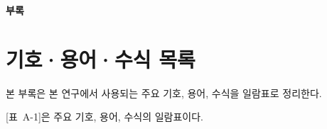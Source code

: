 
\clearpage
\thispagestyle{plain}
{}
\vspace*{0.35\textheight}
\begin{center}{\ChapterFont\bfseries\fontsize{16}{22}\selectfont 부록}\end{center}
\clearpage

\chapter{기호·용어·수식 목록}
\label{app:notation-list}


본 부록은 본 연구에서 사용되는 주요 기호, 용어, 수식을 일람표로 정리한다.

\label{app:notation-overview}
\label{app:symbols}

[표~A-1]은 주요 기호, 용어, 수식의 일람표이다.

